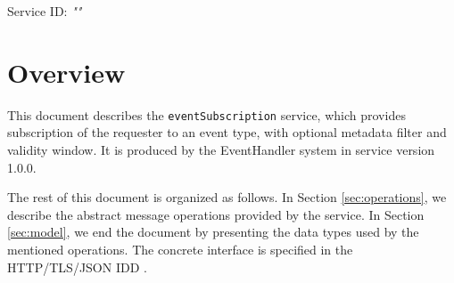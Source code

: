 \documentclass[a4paper]{arrowhead}
\begin{document}
\sloppy

\ArrowheadSetup

\begin{center}
  \vspace*{1cm}
  \huge{\arrowtitle}

  \vspace*{0.2cm}
  \LARGE{\arrowtype}
  \vspace*{1cm}

  \Large{Service ID: \textit{"\arrowid"}}

  \vspace*{\fill}


  \vspace*{1cm}
  \vspace*{\fill}

  \begin{abstract}
    This document describes the \texttt{eventSubscription} service, version 1.0.0, produced by the EventHandler support system of Arrowhead 5.2.2.
  \end{abstract}

  \vspace*{1cm}
\end{center}

\newpage

\tableofcontents
\newpage

\section{Overview}
\label{sec:overview}

This document describes the \texttt{eventSubscription} service, which provides subscription of the requester to an event type, with optional metadata filter and validity window.
It is produced by the EventHandler system \cite{eh-sysd} in service version 1.0.0.

The rest of this document is organized as follows.
In Section \ref{sec:operations}, we describe the abstract message operations provided by the service.
In Section \ref{sec:model}, we end the document by presenting the data types used by the mentioned operations.
The concrete interface is specified in the HTTP/TLS/JSON IDD \cite{eh-eventSubscription-http-idd}.
\end{document}
